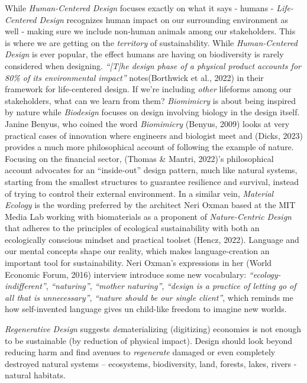 \documentclass[
  12pt,
  letterpaper,
  DIV=11,
  numbers=noendperiod]{scrartcl}
\begin{document}
While \emph{Human-Centered Design} focuses exactly on what it says -
humans - \emph{Life-Centered Design} recognizes human impact on our
surrounding environment as well - making sure we include non-human
animals among our stakeholders. This is where we are getting on the
\emph{territory} of sustainability. While \emph{Human-Centered Design}
is ever popular, the effect humans are having on biodiversity is rarely
considered when designing. \emph{``{[}T{]}he design phase of a physical
product accounts for 80\% of its environmental impact''} notes(Borthwick
et al., 2022) in their framework for life-centered design. If we're
including \emph{other} lifeforms among our stakeholders, what can we
learn from them? \emph{Biomimicry} is about being inspired by nature
while \emph{Biodesign} focuses on design involving biology in the design
itself. Janine Benyus, who coined the word \emph{Biomimicry} (Benyus,
2009) looks at very practical cases of innovation where engineers and
biologist meet and (Dicks, 2023) provides a much more philosophical
account of following the example of nature. Focusing on the financial
sector, (Thomas \& Mantri, 2022)'s philosophical account advocates for
an ``inside-out'' design pattern, much like natural systems, starting
from the smallest structures to guarantee resilience and survival,
instead of trying to control their external environment. In a similar
vein, \emph{Material Ecology} is the wording preferred by the architect
Neri Oxman based at the MIT Media Lab working with biomaterials as a
proponent of \emph{Nature-Centric Design} that adheres to the principles
of ecological sustainability with both an ecologically conscious mindset
and practical toolset (Hencz, 2022). Language and our mental concepts
shape our reality, which makes language-creation an important tool for
sustainability. Neri Oxman's expressions in her (World Economic Forum,
2016) interview introduce some new vocabulary:
\emph{``ecology-indifferent''}, \emph{``naturing''}, \emph{``mother
naturing''}, \emph{``design is a practice of letting go of all that is
unnecessary''}, \emph{``nature should be our single client''}, which
reminds me how self-invented language gives un child-like freedom to
imagine new worlds.

\emph{Regenerative Design} suggests \emph{de}materializing (digitizing)
economies is not enough to be sustainable (by reduction of physical
impact). Design should look beyond reducing harm and find avenues to
\emph{regenerate} damaged or even completely destroyed natural systems
-- ecosystems, biodiversity, land, forests, lakes, rivers - natural
habitats.
\end{document}
